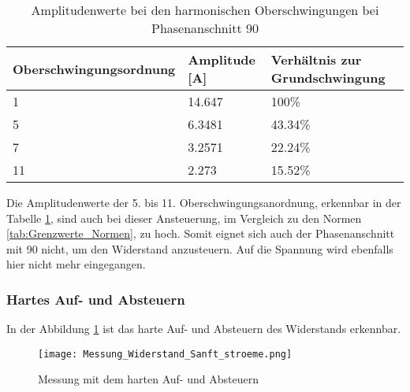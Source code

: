 \begin{table}[ht!]
	\centering
	\begin{tabular}{|l|l|l|}
		\hline
		Oberschwingungsordnung 	& Amplitude [A] & Verhältnis zur Grundschwingung	\\ \hline
		1       				& 14.647   		& 100\%								\\ \hline
		5      					& 6.3481    	& 43.34\%							\\ \hline
		7      					& 3.2571    	& 22.24\%							\\ \hline
		11      				& 2.273    		& 15.52\%							\\ \hline
	\end{tabular}
	\caption{Amplitudenwerte bei den harmonischen Oberschwingungen bei Phasenanschnitt 90\textdegree}\label{tab:Phas_90_Stroeme}
\end{table}

Die Amplitudenwerte der 5. bis 11. Oberschwingungsanordnung, erkennbar in der Tabelle \ref{tab:Phas_90_Stroeme}, sind auch bei dieser Ansteuerung, im Vergleich zu den Normen \ref{tab:Grenzwerte_Normen}, zu hoch. Somit eignet sich auch der Phasenanschnitt mit 90\textdegree \hspace{0.02cm} nicht, um den Widerstand anzusteuern. Auf die Spannung wird ebenfalls hier nicht mehr eingegangen. 


\newpage
\subsubsection*{Hartes Auf- und Absteuern}

In der Abbildung \ref{fig:Mess_Widerstand_Sanft_stroeme} ist das harte Auf- und Absteuern des Widerstands erkennbar. 

\begin{figure}[ht!]
	\centering
	\texttt{[image: Messung\_Widerstand\_Sanft\_stroeme.png]}	
	\caption{Messung mit dem harten Auf- und Absteuern}\label{fig:Mess_Widerstand_Sanft_stroeme}
\end{figure}


